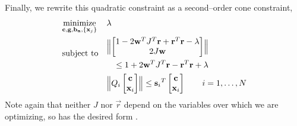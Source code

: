 Finally, we rewrite this quadratic constraint as a second--order cone
constraint,
\begin{equation}
  \begin{aligned}
    & \underset{\AllVars}{\text{minimize}} & & \lambda \\
    & \text{subject to}
    & & \begin{split}
          \Bigl\| \begin{bmatrix}
            1 - 2\vec{w}^T J^T \vec{r} + \vec{r}^T\vec{r} - \lambda \\
            2 J \vec{w}
          \end{bmatrix} \Bigr\| \\
          \leq
          1 + 2 \vec{w}^T J^T \vec{r} - \vec{r}^T\vec{r} + \lambda
        \end{split}\\
    & & &
    \Bigl\| Q_i \begin{bmatrix}\Controls\\\Landmark_i\end{bmatrix} \Bigr\| \leq
    {\vec{s}_i}^T \begin{bmatrix}\Controls\\\Landmark_i\end{bmatrix}
    ~~~~~~
    i = 1,\ldots,N
  \end{aligned}
  \label{final-problem}
\end{equation}
Note again that neither $J$ nor $\vec{r}$ depend on the variables over
which we are optimizing, so  has the desired form
.
